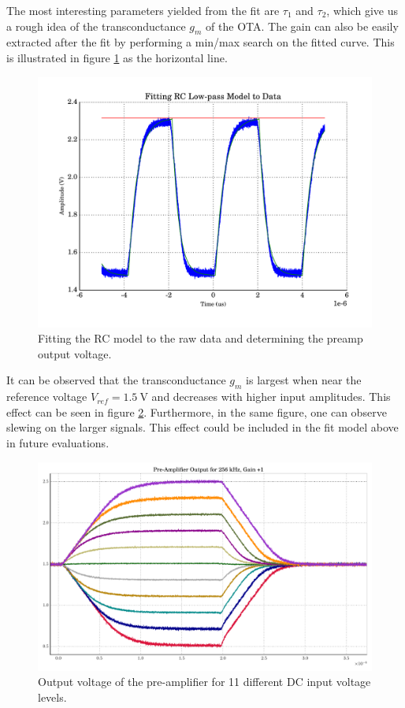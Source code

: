 The  most  interesting  parameters  yielded  from  the fit  are  $\tau_1$  and
$\tau_2$, which give us a rough idea of the transconductance $g_m$ of the OTA.
The gain can also be easily extracted after  the  fit  by performing a min/max
search   on   the   fitted   curve.   This    is    illustrated    in   figure
\ref{fig:fitting_rc_model} as the horizontal line.

\begin{figure}
    \centering
    \includegraphics[width=\linewidth]{images/plots/fitting_rc_model.pdf}
    \caption{Fitting the RC model to the raw data and determining the preamp output voltage.}
    \label{fig:fitting_rc_model}
\end{figure}

It can be observed that the transconductance $g_m$ is largest  when  near  the
reference  voltage $V_{ref}=\SI{1.5}{\volt}$ and decreases with  higher  input
amplitudes. This effect  can  be  seen  in figure \ref{fig:preamp_11_signals}.
Furthermore, in the  same  figure,  one  can  observe  slewing  on  the larger
signals.  This  effect  could  be included in the fit model  above  in  future
evaluations.

\begin{figure}
    \centering
    \includegraphics[width=\linewidth]{images/plots/vinComparisonPreamp.pdf}
    \caption{Output voltage of the pre-amplifier for 11 different DC input voltage levels.}
    \label{fig:preamp_11_signals}
\end{figure}

